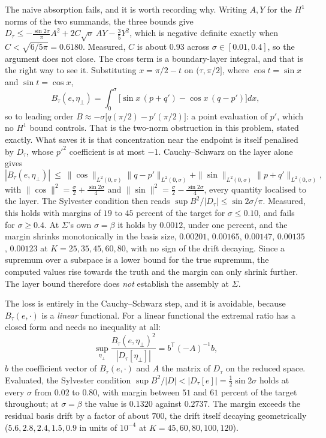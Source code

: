 \documentclass[11pt]{article}
\theoremstyle{definition}
\newcommand{\Sig}{\Sigma}
\begin{document}
The naive absorption fails, and it is worth recording why. Writing $A,Y$ for the $H^1$
norms of the two summands, the three bounds give
$D_\tau\le-\tfrac{\sin2\sigma}{\pi}A^2+2C\sqrt\sigma\,AY-\tfrac35Y^2$, which is negative
definite exactly when $C<\sqrt{6/5\pi}=0.6180$. Measured, $C$ is about $0.93$ across
$\sigma\in[0.01,0.4]$, so the argument does not close. The cross term is a boundary-layer integral, and that is the right way to see it.
Substituting $x=\pi/2-t$ on $(\tau,\pi/2]$, where $\cos t=\sin x$ and $\sin t=\cos x$,
\[
  B_\tau(e,\eta_\perp)=\int_0^\sigma\bigl[\sin x\,(p+q')-\cos x\,(q-p')\bigr]dx ,
\]
so to leading order $B\approx-\sigma\bigl[q(\pi/2)-p'(\pi/2)\bigr]$: a point evaluation of
$p'$, which no $H^1$ bound controls. That is the two-norm obstruction in this problem,
stated exactly. What saves it is that concentration near the endpoint is itself penalised
by $D_\tau$, whose $p'^2$ coefficient is at most $-1$. Cauchy--Schwarz on the layer alone
gives
\[
  |B_\tau(e,\eta_\perp)|\ \le\ \|\cos\|_{L^2(0,\sigma)}\|q-p'\|_{L^2(0,\sigma)}
   +\|\sin\|_{L^2(0,\sigma)}\|p+q'\|_{L^2(0,\sigma)} ,
\]
with $\|\cos\|^2=\tfrac\sigma2+\tfrac{\sin2\sigma}4$ and
$\|\sin\|^2=\tfrac\sigma2-\tfrac{\sin2\sigma}4$, every quantity localised to the layer.
The Sylvester condition then reads $\sup B^2/|D_\tau|\le\sin2\sigma/\pi$. Measured, this
holds with margins of $19$ to $45$ percent of the target for $\sigma\le0.10$, and fails for
$\sigma\ge0.4$. At $\Sig$'s own $\sigma=\beta$ it holds by $0.0012$, under one percent, and
the margin shrinks monotonically in the basis size, $0.00201$, $0.00165$, $0.00147$,
$0.00135$, $0.00123$ at $K=25,35,45,60,80$, with no sign of the drift decaying. Since a
supremum over a subspace is a lower bound for the true supremum, the computed values rise
towards the truth and the margin can only shrink further. The layer bound therefore does
\emph{not} establish the assembly at $\Sig$.

The loss is entirely in the Cauchy--Schwarz step, and it is avoidable, because
$B_\tau(e,\cdot)$ is a \emph{linear} functional. For a linear functional the extremal
ratio has a closed form and needs no inequality at all:
\[
  \sup_{\eta_\perp}\frac{B_\tau(e,\eta_\perp)^2}{|D_\tau[\eta_\perp]|}
   = b^{\mathsf T}(-A)^{-1}b ,
\]
$b$ the coefficient vector of $B_\tau(e,\cdot)$ and $A$ the matrix of $D_\tau$ on the
reduced space. Evaluated, the Sylvester condition
$\sup B^2/|D|<|D_\tau[e]|=\tfrac12\sin2\sigma$ holds at every $\sigma$ from $0.02$ to
$0.80$, with margin between $51$ and $61$ percent of the target throughout; at
$\sigma=\beta$ the value is $0.1320$ against $0.2737$. The margin exceeds the residual
basis drift by a factor of about $700$, the drift itself decaying geometrically
($5.6,2.8,2.4,1.5,0.9$ in units of $10^{-4}$ at $K=45,60,80,100,120$).
\end{document}

